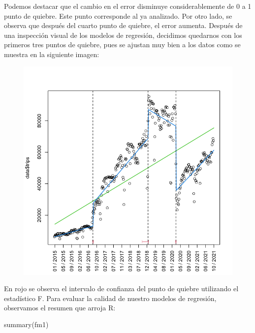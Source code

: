 \documentclass[
]{article}
\newenvironment{Shaded}{}{}
\newcommand{\FunctionTok}[1]{\textcolor[rgb]{0.02,0.16,0.49}{#1}}
\newcommand{\NormalTok}[1]{#1}
\begin{document}
Podemos destacar que el cambio en el error disminuye considerablemente
de 0 a 1 punto de quiebre. Este punto corresponde al ya analizado. Por
otro lado, se observa que después del cuarto punto de quiebre, el error
aumenta. Después de una inspección visual de los modelos de regresión,
decidimos quedarnos con los primeros tres puntos de quiebre, pues se
ajustan muy bien a los datos como se muestra en la siguiente imagen:

\begin{figure}
\centering
\includegraphics{../plots/structChange_files/structChange_17_4.png}
\caption{}
\end{figure}

En rojo se observa el intervalo de confianza del punto de quiebre
utilizando el estadístico F. Para evaluar la calidad de nuestro modelos
de regresión, observamos el resumen que arroja R:

\begin{Shaded}
\begin{Highlighting}[]
\FunctionTok{summary}\NormalTok{(fm1)}
\end{Highlighting}
\end{Shaded}
\end{document}
